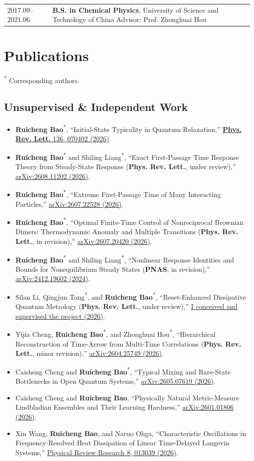 \documentclass[10pt,a4paper]{article}
\makeatletter
\newcommand{\entry}[2]{%
  \begin{tabularx}{\textwidth}[t]{@{}>{\raggedright\arraybackslash}p{0.19\textwidth}>{\raggedright\arraybackslash}X@{}}
    \strut\color{muted}#1 & \strut#2
  \end{tabularx}\par
}
\newcommand{\pub}[4]{%
  \item #1, ``#2,'' \href{#4}{#3}.
}
\newcommand{\corr}[1]{#1\textsuperscript{*}}
\makeatother
\begin{document}
\entry{2017.09--2021.06}{\textbf{B.S. in Chemical Physics}, University of Science and Technology of China\newline
Advisor: Prof. Zhonghuai Hou}

\section{Publications}

{\footnotesize\color{muted}\textsuperscript{*} Corresponding authors.}

\subsection{Unsupervised \& Independent Work}

\begin{itemize}
  \pub{\corr{\textbf{Ruicheng Bao}}}{Initial-State Typicality in Quantum Relaxation}{\textbf{Phys. Rev. Lett.} 136, 070402 (2026)}{https://doi.org/10.1103/wgr5-lb6b}
  \pub{\corr{\textbf{Ruicheng Bao}} and \corr{Shiling Liang}}{Exact First-Passage Time Response Theory from Steady-State Response (\textbf{Phys. Rev. Lett.}, under review)}{arXiv:2608.11202 (2026)}{https://arxiv.org/abs/2608.11202}
  \pub{\corr{\textbf{Ruicheng Bao}}}{Extreme First-Passage Time of Many Interacting Particles}{arXiv:2607.22528 (2026)}{https://arxiv.org/abs/2607.22528}
  \pub{\corr{\textbf{Ruicheng Bao}}}{Optimal Finite-Time Control of Nonreciprocal Brownian Dimers: Thermodynamic Anomaly and Multiple Transitions  (\textbf{Phys. Rev. Lett.}, in revision)}{arXiv:2607.20420 (2026)}{https://arxiv.org/abs/2607.20420}
   \pub{\corr{\textbf{Ruicheng Bao}} and \corr{Shiling Liang}}{Nonlinear Response Identities and Bounds for Nonequilibrium Steady States (\textbf{PNAS},  in revision)}{arXiv:2412.19602 (2024)}{https://arxiv.org/abs/2412.19602}
\pub{Silan Li, \corr{Qingjun Tong}, and \corr{\textbf{Ruicheng Bao}}}{Reset-Enhanced Dissipative Quantum Metrology (\textbf{Phys. Rev. Lett.}, under review)}{I conceived and supervised the project (2026)}{}
  \pub{Yijia Cheng, \corr{\textbf{Ruicheng Bao}}, and \corr{Zhonghuai Hou}}{Hierarchical Reconstruction of Time-Arrow from Multi-Time Correlations (\textbf{Phys. Rev. Lett.}, minor revision)}{arXiv:2604.25749 (2026)}{https://arxiv.org/abs/2604.25749}
    \pub{Caisheng Cheng and \corr{\textbf{Ruicheng Bao}}}{Typical Mixing and Rare-State Bottlenecks in Open Quantum Systems}{arXiv:2605.07619 (2026)}{https://arxiv.org/abs/2605.07619}
  \pub{Caisheng Cheng and \textbf{Ruicheng Bao}}{Physically Natural Metric-Measure Lindbladian Ensembles and Their Learning Hardness}{arXiv:2601.01806 (2026)}{https://arxiv.org/abs/2601.01806}
  \pub{Xin Wang, \textbf{Ruicheng Bao}, and Naruo Ohga}{Characteristic Oscillations in Frequency-Resolved Heat Dissipation of Linear Time-Delayed Langevin Systems}{Physical Review Research 8, 013039 (2026)}{https://doi.org/10.1103/x2dm-9p8m}
\end{itemize}
\end{document}
